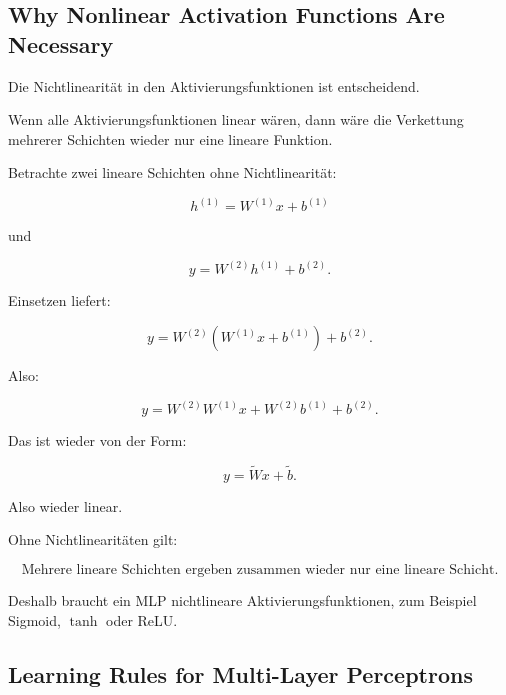 \documentclass[11pt,a4paper]{scrartcl}
\begin{document}
\subsection{Why Nonlinear Activation Functions Are Necessary}

\begin{notebox}
    Die Nichtlinearität in den Aktivierungsfunktionen ist entscheidend.

    Wenn alle Aktivierungsfunktionen linear wären, dann wäre die Verkettung
    mehrerer Schichten wieder nur eine lineare Funktion.
\end{notebox}

\begin{calculationbox}
    Betrachte zwei lineare Schichten ohne Nichtlinearität:

    \[
        h^{(1)}
        =
        W^{(1)}x + b^{(1)}
    \]

    und

    \[
        y
        =
        W^{(2)}h^{(1)} + b^{(2)}.
    \]

    Einsetzen liefert:

    \[
        y
        =
        W^{(2)}(W^{(1)}x + b^{(1)}) + b^{(2)}.
    \]

    Also:

    \[
        y
        =
        W^{(2)}W^{(1)}x
        +
        W^{(2)}b^{(1)}
        +
        b^{(2)}.
    \]

    Das ist wieder von der Form:

    \[
        y
        =
        \widetilde W x + \widetilde b.
    \]

    Also wieder linear.
\end{calculationbox}

\begin{answerbox}
    Ohne Nichtlinearitäten gilt:

    \[
        \boxed{
            \text{Mehrere lineare Schichten ergeben zusammen wieder nur eine lineare Schicht.}
        }
    \]

    Deshalb braucht ein MLP nichtlineare Aktivierungsfunktionen, zum Beispiel
    Sigmoid, \(\tanh\) oder ReLU.
\end{answerbox}

\subsection{Learning Rules for Multi-Layer Perceptrons}
\end{document}

